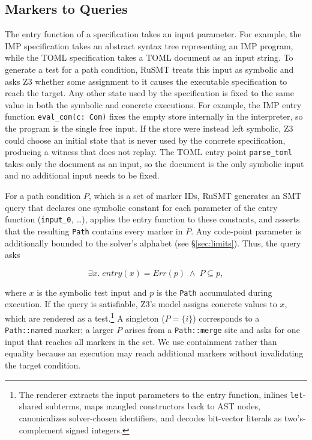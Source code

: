\documentclass[sigconf,screen]{acmart}
\theoremstyle{definition}
\theoremstyle{remark}
\newcommand{\rusmt}{RuSMT}
\newcommand{\imp}{IMP}
\newcommand{\toml}{TOML}
\newcommand{\code}[1]{\texttt{#1}}
\begin{document}
\subsection{Markers to Queries}

The entry function of a specification takes an input parameter. For example, the \imp{} specification takes an abstract syntax tree representing an \imp{} program, while the \toml{} specification takes a TOML document as an input string. To generate a test for a path condition, \rusmt{} treats this input as symbolic and asks Z3 whether some assignment to it causes the executable specification to reach the target. Any other state used by the specification is fixed to the same value in both the symbolic and concrete executions. For example, the \imp{} entry function \code{eval\_com(c: Com)} fixes the empty store internally in the interpreter, so the program is the single free input. If the store were instead left symbolic, Z3 could choose an initial state that is never used by the concrete specification, producing a witness that does not replay. The \toml{} entry point \code{parse\_toml} takes only the document as an input, so the document is the only symbolic input and no additional input needs to be fixed.

For a path condition $P$, which is a set of marker IDs, \rusmt{} generates an SMT query that declares one symbolic constant for each parameter of the entry function (\code{input\_0}, \ldots), applies the entry function to these constants, and asserts that the resulting \code{Path} contains every marker in $P$. Any code-point parameter is additionally bounded to the solver's alphabet (see \S\ref{sec:limits}). Thus, the query asks

\[
\exists x.\; \mathit{entry}(x) = \mathit{Err}(p) \;\wedge\; P \subseteq p,
\]

where $x$ is the symbolic test input and $p$ is the \code{Path} accumulated during execution. If the query is satisfiable, Z3's model assigns concrete values to $x$, which are rendered as a test.\footnote{The renderer extracts the input parameters to the entry function, inlines \code{let}-shared subterms, maps mangled constructors back to AST nodes, canonicalizes solver-chosen identifiers, and decodes bit-vector literals as two's-complement signed integers.} A singleton ($P=\{i\}$) corresponds to a \code{Path::named} marker; a larger $P$ arises from a \code{Path::merge} site and asks for one input that reaches all markers in the set. We use containment rather than equality because an execution may reach additional markers without invalidating the target condition.
\end{document}
